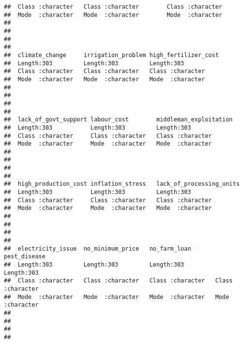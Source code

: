 \documentclass[
]{article}
\begin{document}
\begin{verbatim}
##  Class :character   Class :character        Class :character  
##  Mode  :character   Mode  :character        Mode  :character  
##                                                               
##                                                               
##                                                               
##                                                               
##  climate_change     irrigation_problem high_fertilizer_cost
##  Length:303         Length:303         Length:303          
##  Class :character   Class :character   Class :character    
##  Mode  :character   Mode  :character   Mode  :character    
##                                                            
##                                                            
##                                                            
##                                                            
##  lack_of_govt_support labour_cost        middleman_exploitation
##  Length:303           Length:303         Length:303            
##  Class :character     Class :character   Class :character      
##  Mode  :character     Mode  :character   Mode  :character      
##                                                                
##                                                                
##                                                                
##                                                                
##  high_production_cost inflation_stress   lack_of_processing_units
##  Length:303           Length:303         Length:303              
##  Class :character     Class :character   Class :character        
##  Mode  :character     Mode  :character   Mode  :character        
##                                                                  
##                                                                  
##                                                                  
##                                                                  
##  electricity_issue  no_minimum_price   no_farm_loan       pest_disease      
##  Length:303         Length:303         Length:303         Length:303        
##  Class :character   Class :character   Class :character   Class :character  
##  Mode  :character   Mode  :character   Mode  :character   Mode  :character  
##                                                                             
##                                                                             
##                                                                             
##                                                                             

\end{verbatim}
\end{document}
